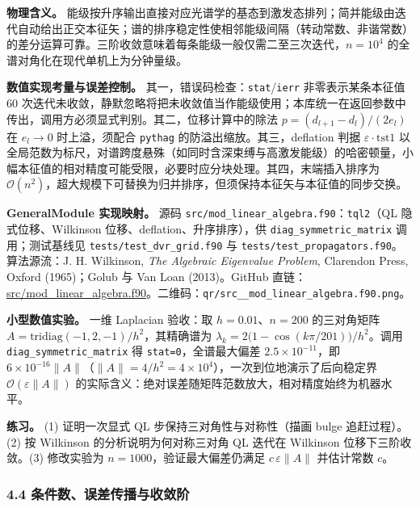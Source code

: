 \documentclass[
]{ctexbook}
\begin{document}
\textbf{物理含义。}
能级按升序输出直接对应光谱学的基态到激发态排列；简并能级由迭代自动给出正交本征矢；谱的排序稳定性使相邻能级间隔（转动常数、非谐常数）的差分运算可靠。三阶收敛意味着每条能级一般仅需二至三次迭代，\(n=10^{4}\)
的全谱对角化在现代单机上为分钟量级。

\textbf{数值实现考量与误差控制。}
其一，错误码检查：\texttt{stat}/\texttt{ierr} 非零表示某条本征值 60
次迭代未收敛，静默忽略将把未收敛值当作能级使用；本库统一在返回参数中传出，调用方必须显式判别。其二，位移计算中的除法
\(p=(d_{l+1}-d_l)/(2e_l)\) 在 \(e_l\to0\) 时上溢，须配合 \texttt{pythag}
的防溢出缩放。其三，deflation 判据 \(\varepsilon\cdot\mathrm{tst1}\)
以全局范数为标尺，对谱跨度悬殊（如同时含深束缚与高激发能级）的哈密顿量，小幅本征值的相对精度可能受限，必要时应分块处理。其四，末端插入排序为
\(\mathcal{O}(n^{2})\)，超大规模下可替换为归并排序，但须保持本征矢与本征值的同步交换。

\textbf{GeneralModule 实现映射。} 源码
\texttt{src/mod\_linear\_algebra.f90}：\texttt{tql2}（QL
隐式位移、Wilkinson 位移、deflation、升序排序），供
\texttt{diag\_symmetric\_matrix} 调用；测试基线见
\texttt{tests/test\_dvr\_grid.f90} 与
\texttt{tests/test\_propagators.f90}。算法源流：J. H. Wilkinson,
\emph{The Algebraic Eigenvalue Problem}, Clarendon Press, Oxford
(1965)；Golub 与 Van Loan (2013)。GitHub
直链：\href{https://github.com/l1Ha/QuantumGeneralModule/blob/main/src/mod_linear_algebra.f90}{src/mod\_linear\_algebra.f90}。二维码：\texttt{qr/src\_\_mod\_linear\_algebra.f90.png}。

\textbf{小型数值实验。} 一维 Laplacian 验收：取 \(h=0.01\)、\(n=200\)
的三对角矩阵 \(A=\mathrm{tridiag}(-1,2,-1)/h^{2}\)，其精确谱为
\(\lambda_k=2\bigl(1-\cos(k\pi/201)\bigr)/h^{2}\)。调用
\texttt{diag\_symmetric\_matrix} 得 \texttt{stat=0}，全谱最大偏差
\(2.5\times10^{-11}\)，即
\(6\times10^{-16}\|A\|\)（\(\|A\|=4/h^{2}=4\times10^{4}\)），一次到位地演示了后向稳定界
\(\mathcal{O}(\varepsilon\|A\|)\)
的实际含义：绝对误差随矩阵范数放大，相对精度始终为机器水平。

\textbf{练习。} (1) 证明一次显式 QL 步保持三对角性与对称性（描画 bulge
追赶过程）。(2) 按 Wilkinson 的分析说明为何对称三对角 QL 迭代在
Wilkinson 位移下三阶收敛。(3) 修改实验为 \(n=1000\)，验证最大偏差仍满足
\(c\,\varepsilon\|A\|\) 并估计常数 \(c\)。

\hypertarget{ux6761ux4ef6ux6570ux8befux5deeux4f20ux64adux4e0eux6536ux655bux9636}{%
\subsubsection{4.4
条件数、误差传播与收敛阶}\label{ux6761ux4ef6ux6570ux8befux5deeux4f20ux64adux4e0eux6536ux655bux9636}}
\end{document}
